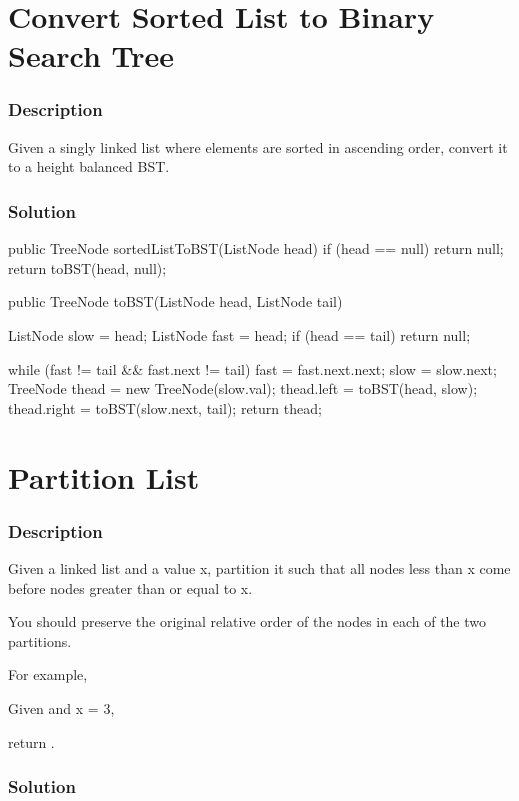 \newpage

\section{Convert Sorted List to Binary Search Tree} %

\subsubsection{Description}
Given a singly linked list where elements are sorted in ascending order, convert it to a height balanced BST.
\subsubsection{Solution}

\begin{Code}
public TreeNode sortedListToBST(ListNode head) {
    if (head == null) return null;
    return toBST(head, null);
}

public TreeNode toBST(ListNode head, ListNode tail) {
    ListNode slow = head;
    ListNode fast = head;
    if (head == tail) return null;

    while (fast != tail && fast.next != tail) {
        fast = fast.next.next;
        slow = slow.next;
    }
    TreeNode thead = new TreeNode(slow.val);
    thead.left = toBST(head, slow);
    thead.right = toBST(slow.next, tail);
    return thead;
}
\end{Code}

\newpage

\section{Partition List} %

\subsubsection{Description}
Given a linked list and a value x, partition it such that all nodes less than x come before nodes greater than or equal to x.

You should preserve the original relative order of the nodes in each of the two partitions.

For example,

Given  and x = 3,

return .

\subsubsection{Solution}

